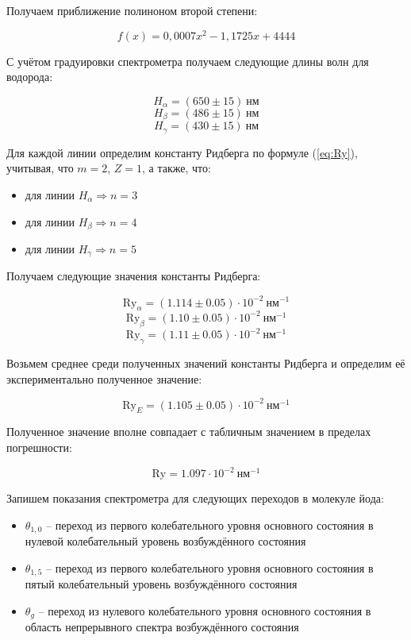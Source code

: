         Получаем приближение полиноном второй степени: 
        
        \[ f(x) = 0,0007x^{2} -1,1725x + 4444 \]


		С учётом градуировки спектрометра получаем следующие длины волн для водорода: 
        
		
		\[	H_{\alpha} = (650\pm 15)\ \text{нм} \]
        \[  H_{\beta} = (486\pm 15)\ \text{нм} \] 
        \[  H_{\gamma} = (430\pm  15)\  \text{нм} \]
		
		
		Для каждой линии определим константу Ридберга по формуле (\ref{eq:Ry}), учитывая, что $m=2$, $Z=1$, а также, что:
        
        \newpage

        \begin{itemize}
            \item для линии $H_{\alpha} \Rightarrow n=3$
            \item для линии $H_{\beta}  \Rightarrow n=4$
            \item для линии $H_{\gamma} \Rightarrow n=5$
        \end{itemize}
        Получаем следующие значения константы Ридберга:
		
	    \[ \text{Ry}_{\alpha}=(1.114\pm 0.05) \cdot 10^{-2} \ \text{нм}^{-1} \] 
        \[ \text{Ry}_{\beta} =(1.10\pm 0.05)\cdot 10^{-2} \ \text{нм}^{-1} \] 
        \[ \text{Ry}_{\gamma}=(1.11\pm 0.05)\cdot 10^{-2}\ \text{нм}^{-1} \]
		
	
		Возьмем среднее среди полученных значений константы Ридберга и определим её экспериментально полученное значение:
		
		\[ \text{Ry}_E=(1.105\pm 0.05)\cdot 10^{-2} ~\text{нм}^{-1} \]

		Полученное значение вполне совпадает с табличным значением в пределах погрешности:

		\[ \text{Ry}=1.097\cdot 10^{-2} \ \text{нм}^{-1} \]
		
		Запишем показания спектрометра для следующих переходов в молекуле йода: 
        \begin{itemize}
            \item $\theta_{1,0}$ -- переход из первого колебательного уровня основного состояния в нулевой колебательный уровень возбуждённого состояния
            \item $\theta_{1,5}$ -- переход из первого колебательного уровня основного состояния в пятый колебательный уровень возбуждённого состояния
            \item $\theta_{g}$ -- переход из нулевого колебательного уровня основного состояния в область непрерывного спектра возбуждённого состояния
        \end{itemize}
        
